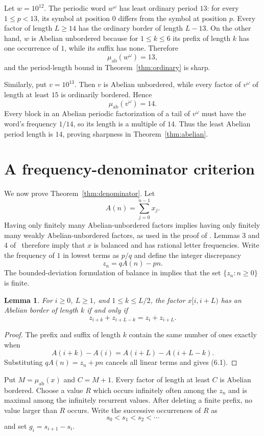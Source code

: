 \documentclass[11pt]{article}
\newtheorem{lemma}[theorem]{Lemma}
\begin{document}
Let $w=10^{12}$. The periodic word $w^\omega$ has least ordinary period $13$:
for every $1\le p<13$, its symbol at position $0$ differs from the symbol at
position $p$. Every factor of length $L\ge14$ has the ordinary border of
length $L-13$. On the other hand, $w$ is Abelian unbordered because for
$1\le k\le6$ its prefix of length $k$ has one occurrence of $1$, while its
suffix has none. Therefore
\[
\mu_{\mathrm{ab}}(w^\omega)=13,
\]
and the period-length bound in Theorem~\ref{thm:ordinary} is sharp.

Similarly, put $v=10^{13}$. Then $v$ is Abelian unbordered, while every factor
of $v^\omega$ of length at least $15$ is ordinarily bordered. Hence
\[
\mu_{\mathrm{ab}}(v^\omega)=14.
\]
Every block in an Abelian periodic factorization of a tail of $v^\omega$ must
have the word's frequency $1/14$, so its length is a multiple of $14$. Thus
the least Abelian period length is $14$, proving sharpness in
Theorem~\ref{thm:abelian}.

\section{A frequency-denominator criterion}

We now prove Theorem~\ref{thm:denominator}. Let
\[
A(n)=\sum_{j=0}^{n-1}x_j.
\]
Having only finitely many Abelian-unbordered factors implies having only
finitely many weakly Abelian-unbordered factors, as used in the proof of
\cite[Theorem~5]{CHPZ}. Lemmas 3 and 4 of~\cite{CHPZ} therefore imply that
$x$ is balanced and has rational letter frequencies. Write the frequency of
$1$ in lowest terms as $p/q$ and define the integer discrepancy
\[
z_n=qA(n)-pn.
\]
The bounded-deviation formulation of balance in
\cite[Proposition~1]{CHPZ} implies that the set $\{z_n:n\ge0\}$ is finite.

\begin{lemma}\label{lem:border-discrepancy}
For $i\ge0$, $L\ge1$, and $1\le k\le L/2$, the factor $x[i,i+L)$ has an
Abelian border of length $k$ if and only if
\[
z_{i+k}+z_{i+L-k}=z_i+z_{i+L}.
\tag{6.1}
\]
\end{lemma}

\begin{proof}
The prefix and suffix of length $k$ contain the same number of ones exactly
when
\[
A(i+k)-A(i)=A(i+L)-A(i+L-k).
\]
Substituting $qA(n)=z_n+pn$ cancels all linear terms and gives (6.1).
\end{proof}

Put $M=\mu_{\mathrm{ab}}(x)$ and $C=M+1$. Every factor of length at least
$C$ is Abelian bordered. Choose a value $R$ which occurs infinitely often
among the $z_n$ and is maximal among the infinitely recurrent values. After
deleting a finite prefix, no value larger than $R$ occurs. Write the
successive occurrences of $R$ as
\[
s_0<s_1<s_2<\cdots
\]
and set $g_i=s_{i+1}-s_i$.
\end{document}
